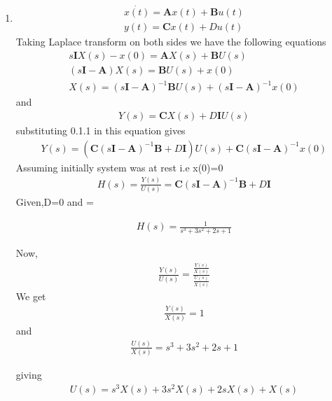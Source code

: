 \begin{enumerate}[label=\thesection.\arabic*.,ref=\thesection.\theenumi]
\item
\begin{align}
 \dot{x(t)}=\bm{A}x(t)+\bm{B}u(t) \\
 y(t)=\bm{C}x(t)+Du(t)
\end{align} 
Taking Laplace transform on both sides we have the following equations
\begin{align}
s\bm{I}X(s)-x(0)= \bm{A}X(s)+ \bm{B}U(s)\\
(s\bm{I}-\bm{A})X(s)= \bm{B}U(s)+ x(0)\\
X(s)={(s\bm{I}-\bm{A})^{-1}}\bm{B} U(s)+ (s\bm{I}-\bm{A})^{-1}x(0)
\end{align}
and
\begin{align}
Y(s)= \bm{C}X(s)+D\bm{I}U(s)
\end{align}
substituting 0.1.1 in this equation gives
\begin{align}
Y(s)=( \bm{C}{(s\bm{I}-\bm{A})^{-1}}\bm{B}+D\bm{I}) U(s) + \bm{C}(s\bm{I}-\bm{A})^{-1}x(0)
\end{align}
Assuming initially system was at rest i.e x(0)=0
\begin{align}
H(s)= {\frac{Y(s)}{U(s)}}= \bm{C}{(s\bm{I}-\bm{A})^{-1}}\bm{B}+D\bm{I}
\end{align}
Given,D=0 and = {}

\begin{align}
H(s)=\frac{1}{s^3 + 3s^2+2s + 1}
\end{align}

Now, 
\begin{align} 
{\frac{Y(s)}{U(s)}}= {\frac{\frac{Y(s)}{X(s)}}{\frac{U(s)}{X(s)}}}  
\end{align}
We get
\begin{align}
 {\frac{Y(s)}{X(s)}}= 1
\end{align}
and
\begin{align}
{\frac{U(s)}{X(s)}}={s^3 + 3s^2+2s + 1}
\end{align}

giving
\begin{align}
U(s)= s^3 X(s) + 3s^2 X(s)+2sX(s) + X(s)
\end{align}


\end{enumerate}

